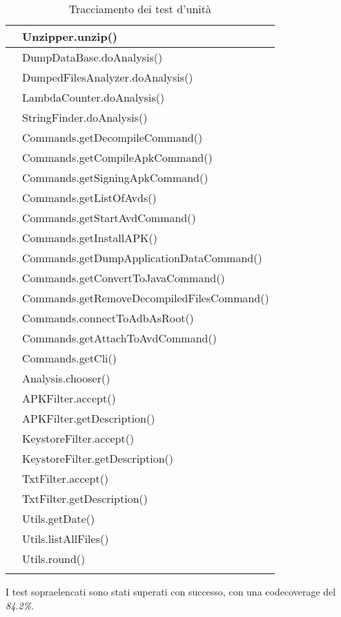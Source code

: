 \begin{center}
\begin{longtable}{ |C{3cm} |C{10.5cm}|}
         & Unzipper.unzip()                           \\\hline
         & DumpDataBase.doAnalysis()                  \\\hline
         & DumpedFilesAnalyzer.doAnalysis()           \\\hline
         & LambdaCounter.doAnalysis()                 \\\hline
         & StringFinder.doAnalysis()                  \\\hline
         & Commands.getDecompileCommand()             \\\hline
         & Commands.getCompileApkCommand()            \\\hline
         & Commands.getSigningApkCommand()            \\\hline
         & Commands.getListOfAvds()                   \\\hline
         & Commands.getStartAvdCommand()              \\\hline
         & Commands.getInstallAPK()                   \\\hline
         & Commands.getDumpApplicationDataCommand()   \\\hline
         & Commands.getConvertToJavaCommand()         \\\hline
         & Commands.getRemoveDecompiledFilesCommand() \\\hline
         & Commands.connectToAdbAsRoot()              \\\hline
         & Commands.getAttachToAvdCommand()           \\\hline
         & Commands.getCli()                          \\\hline
         & Analysis.chooser()                         \\\hline
         & APKFilter.accept()                         \\\hline
         & APKFilter.getDescription()                 \\\hline
         & KeystoreFilter.accept()                    \\\hline
         & KeystoreFilter.getDescription()            \\\hline
         & TxtFilter.accept()                         \\\hline
         & TxtFilter.getDescription()                 \\\hline
         & Utils.getDate()                            \\\hline
         & Utils.listAllFiles()                       \\\hline
         & Utils.round()                              \\\hline
        \caption{Tracciamento dei test d'unità}
    \end{longtable}
\end{center}

I test sopraelencati sono stati superati con successo, con una \gls{codecoverage} del \textit{84.2\%}.
